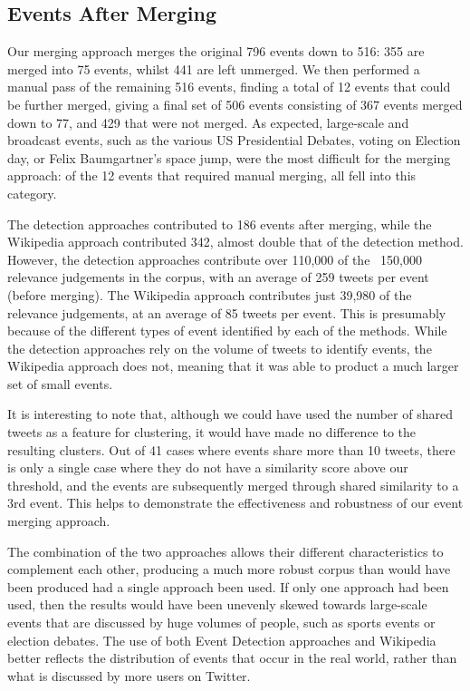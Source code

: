 \subsection{Events After Merging}
Our merging approach merges the original 796 events down to 516: 355 are merged into 75 events, whilst 441 are left unmerged.
We then performed a manual pass of the remaining 516 events, finding a total of 12 events that could be further merged, giving a final set of 506 events consisting of 367 events merged down to 77, and 429 that were not merged.
As expected, large-scale and broadcast events, such as the various US Presidential Debates, voting on Election day, or Felix Baumgartner's space jump, were the most difficult for the merging approach: of the 12 events that required manual merging, all fell into this category.

The detection approaches contributed to 186 events after merging, while the Wikipedia approach contributed 342, almost double that of the detection method.
However, the detection approaches contribute over 110,000 of the ~150,000 relevance judgements in the corpus, with an average of 259 tweets per event (before merging).
The Wikipedia approach contributes just 39,980 of the relevance judgements, at an average of 85 tweets per event.
This is presumably because of the different types of event identified by each of the methods.
While the detection approaches rely on the volume of tweets to identify events, the Wikipedia approach does not, meaning that it was able to product a much larger set of small events.

It is interesting to note that, although we could have used the number of shared tweets as a feature for clustering, it would have made no difference to the resulting clusters.
Out of 41 cases where events share more than 10 tweets, there is only a single case where they do not have a similarity score above our threshold, and the events are subsequently merged through shared similarity to a 3rd event.
This helps to demonstrate the effectiveness and robustness of our event merging approach.

The combination of the two approaches allows their different characteristics to complement each other, producing a much more robust corpus than would have been produced had a single approach been used.
If only one approach had been used, then the results would have been unevenly skewed towards large-scale events that are discussed by huge volumes of people, such as sports events or election debates.
The use of both Event Detection approaches and Wikipedia  better reflects the distribution of events that occur in the real world, rather than what is discussed by more users on Twitter.

